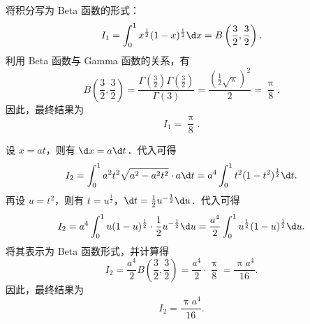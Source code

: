 \begin{solution}

    将积分写为 Beta 函数的形式：
    \begin{equation}\label{eq:sol1-1}
        I_1 = \int_{0}^{1} x^{\frac{1}{2}} (1-x)^{\frac{1}{2}} \d x = B\left(\frac{3}{2}, \frac{3}{2}\right).
    \end{equation}
    利用 Beta 函数与 Gamma 函数的关系，有
    \begin{equation}\label{eq:sol1-2}
        B\left(\frac{3}{2}, \frac{3}{2}\right) = \frac{\Gamma\left(\frac{3}{2}\right) \Gamma\left(\frac{3}{2}\right)}{\Gamma(3)} = \frac{\left(\frac{1}{2}\sqrt{\uppi}\right)^2}{2} = \frac{\uppi}{8}.
    \end{equation}
    因此，最终结果为
    \begin{equation}
        I_1 = \boxed{\frac{\uppi}{8}}.
    \end{equation}


    设 $x = at$，则有 $\d x = a \d t$．代入可得
    \begin{equation}\label{eq:sol2-1}
        I_2 = \int_{0}^{1} a^2 t^2 \sqrt{a^2 - a^2 t^2} \cdot a \d t = a^4 \int_{0}^{1} t^2 (1-t^2)^{\frac{1}{2}} \d t.
    \end{equation}
    再设 $u = t^2$，则有 $t = u^{\frac{1}{2}}$，$\d t = \frac{1}{2} u^{-\frac{1}{2}} \d u$．代入可得
    \begin{equation}\label{eq:sol2-2}
        I_2 = a^4 \int_{0}^{1} u (1-u)^{\frac{1}{2}} \cdot \frac{1}{2} u^{-\frac{1}{2}} \d u = \frac{a^4}{2} \int_{0}^{1} u^{\frac{1}{2}} (1-u)^{\frac{1}{2}} \d u.
    \end{equation}
    将其表示为 Beta 函数形式，并计算得
    \begin{equation}\label{eq:sol2-3}
        I_2 = \frac{a^4}{2} B\left(\frac{3}{2}, \frac{3}{2}\right) = \frac{a^4}{2} \cdot \frac{\uppi}{8} = \frac{\uppi a^4}{16}.
    \end{equation}
    因此，最终结果为
    \begin{equation}
        I_2 = \boxed{\frac{\uppi a^4}{16}}.
    \end{equation}



\end{solution}
